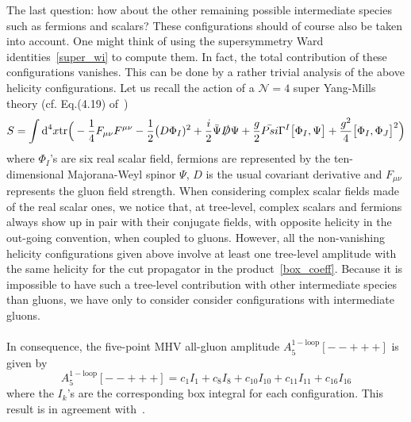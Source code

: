 %
%
%
The last question: how about the other remaining possible intermediate species such as fermions and scalars?
These configurations should of course also be taken into account.
One might think of using the supersymmetry Ward identities~\cref{super_wi} to compute them. 
In fact, the total contribution of these configurations vanishes.
This can be done by a rather trivial analysis of the above helicity configurations.
Let us recall the action of a $\mathcal{N} = 4$ super Yang-Mills theory (cf. \eg Eq.(4.19) of~\cite{Elvang:2013cua})
\begin{equation}
S = \int \textrm{d}^4 x\mathrm{tr}\Big(
-\frac{1}{4}F_{\mu\nu}F^{\mu\nu} - \frac{1}{2}\big(D\Phi_I)^2 + \frac{i}{2}\bar{\Psi}\slashed{D}\Psi + \frac{g}{2}\bar{Psi}\Gamma^I \big[\Phi_I, \Psi\big] + \frac{g^2}{4}\big[\Phi_I, \Phi_J\big]^2\Big) 
\end{equation}
where $\Phi_I$'s are six real scalar field, fermions are represented by the ten-dimensional Majorana-Weyl spinor $\Psi$, $D$ is the usual covariant derivative and $F_{\mu\nu}$ represents the gluon field strength.
When considering complex scalar fields made of the real scalar ones,
we notice that, at tree-level, complex scalars and fermions always show up in pair with their conjugate fields, \ie
with opposite helicity in the out-going convention,
when coupled to gluons. 
However, all the non-vanishing helicity configurations given above involve at least one tree-level amplitude with the same helicity for the cut propagator in the product~\cref{box_coeff}.
Because it is impossible to have such a tree-level contribution with other intermediate species than gluons,
we have only to consider consider configurations with intermediate gluons.
\\\\
In consequence, the five-point MHV all-gluon amplitude $A_5^{\mathrm{1-loop}}[--+++]$ is given by
\begin{equation}\label{final_result_a5mhv}
A_5^{\mathrm{1-loop}}[--+++] = c_1 I_{1} + c_8 I_8 + c_{10}I_{10} + c_{11}I_{11} + c_{16}I_{16}
\end{equation}
where the $I_{k}$'s are the corresponding box integral for each configuration.
This result is in agreement with~\cite{Bern:1994zx}.














